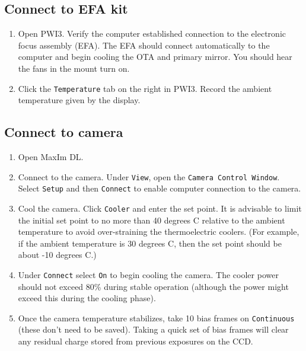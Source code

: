 \documentclass{article}
\begin{document}
	\subsection{Connect to EFA kit}
	\label{sec:connect-to-efa-kit}
	
	\begin{enumerate}
		
		\item Open PWI3. Verify the computer established connection to the electronic focus assembly (EFA). The EFA should connect automatically to the computer and begin cooling the OTA and primary mirror. You should hear the fans in the mount turn on.
		
		\item Click the \texttt{Temperature} tab on the right in PWI3. Record the ambient temperature given by the display.
		
	\end{enumerate}
	
	\subsection{Connect to camera}
	\label{sec:connect-to-camera}
	
	\begin{enumerate}
		
		\item Open MaxIm DL.
		
		\item Connect to the camera. Under \texttt{View}, open the \texttt{Camera Control Window}. Select \texttt{Setup} and then \texttt{Connect} to enable computer connection to the camera.
		
		\item Cool the camera. Click \texttt{Cooler} and enter the set point. It is advisable to limit the initial set point to no more than 40 degrees C relative to the ambient temperature to avoid over-straining the thermoelectric coolers. (For example, if the ambient temperature is 30 degrees C, then the set point should be about -10 degrees C.)
		
		\item Under \texttt{Connect} select \texttt{On} to begin cooling the camera. The cooler power should not exceed 80\% during stable operation (although the power might exceed this during the cooling phase).
		
		\item Once the camera temperature stabilizes, take 10 bias frames on \texttt{Continuous} (these don't need to be saved). Taking a quick set of bias frames will clear any residual charge stored from previous exposures on the CCD.
		
	\end{enumerate}
\end{document}
